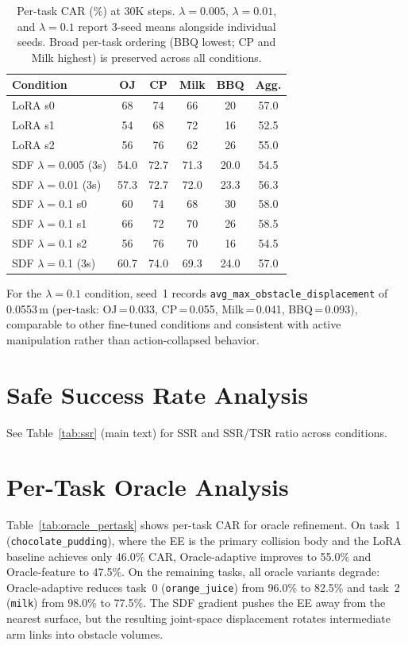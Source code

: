 \begin{table}[h]
\centering
\caption{Per-task CAR (\%) at 30K steps. $\lambda{=}0.005$, $\lambda{=}0.01$, and $\lambda{=}0.1$ report 3-seed means alongside individual seeds. Broad per-task ordering (BBQ lowest; CP and Milk highest) is preserved across all conditions.}
\label{tab:per_task_car}
\vspace{2pt}
\footnotesize
\begin{tabular*}{\columnwidth}{l@{\extracolsep{\fill}}ccccc}
\toprule
Condition & OJ & CP & Milk & BBQ & Agg. \\
\midrule
LoRA s0 & 68 & 74 & 66 & 20 & 57.0 \\
LoRA s1 & 54 & 68 & 72 & 16 & 52.5 \\
LoRA s2 & 56 & 76 & 62 & 26 & 55.0 \\
SDF $\lambda{=}$0.005 (3s) & 54.0 & 72.7 & 71.3 & 20.0 & 54.5 \\
SDF $\lambda{=}$0.01 (3s) & 57.3 & 72.7 & 72.0 & 23.3 & 56.3 \\
SDF $\lambda{=}$0.1 s0 & 60 & 74 & 68 & 30 & 58.0 \\
SDF $\lambda{=}$0.1 s1 & 66 & 72 & 70 & 26 & 58.5 \\
SDF $\lambda{=}$0.1 s2 & 56 & 76 & 70 & 16 & 54.5 \\
SDF $\lambda{=}$0.1 (3s) & 60.7 & 74.0 & 69.3 & 24.0 & 57.0 \\
\bottomrule
\end{tabular*}
\end{table}

For the $\lambda = 0.1$ condition, seed~1 records \texttt{avg\_max\_obstacle\_displacement} of 0.0553\,m (per-task: OJ\,=\,0.033, CP\,=\,0.055, Milk\,=\,0.041, BBQ\,=\,0.093), comparable to other fine-tuned conditions and consistent with active manipulation rather than action-collapsed behavior.

\section{Safe Success Rate Analysis}\label{sec:appendix_ssr}

See Table~\ref{tab:ssr} (main text) for SSR and SSR/TSR ratio across conditions.

\section{Per-Task Oracle Analysis}
\label{sec:appendix_pertask_oracle}

Table~\ref{tab:oracle_pertask} shows per-task CAR for oracle refinement. On task~1 (\texttt{chocolate\_pudding}), where the EE is the primary collision body and the LoRA baseline achieves only 46.0\% CAR, Oracle-adaptive improves to 55.0\% and Oracle-feature to 47.5\%. On the remaining tasks, all oracle variants degrade: Oracle-adaptive reduces task~0 (\texttt{orange\_juice}) from 96.0\% to 82.5\% and task~2 (\texttt{milk}) from 98.0\% to 77.5\%. The SDF gradient pushes the EE away from the nearest surface, but the resulting joint-space displacement rotates intermediate arm links into obstacle volumes.

